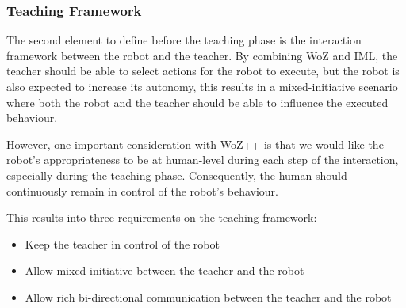 \documentclass[manuscript, review, anonymous]{acmart}
\newcommand{\ra}[1]{\renewcommand{\arraystretch}{#1}}
\newcommand{\woz}{WoZ++\xspace}
\begin{document}

\subsubsection{Teaching Framework}	

\label{sec:framework}
The second element to define before the teaching phase is the interaction
framework between the robot and the teacher. By combining WoZ and IML, the
teacher should be able to select actions for the robot to execute, but the robot
is also expected to increase its autonomy, this results in a mixed-initiative
scenario where both the robot and the teacher should be able to influence the
executed behaviour.

However, one important consideration with \woz is that we would like the robot's
appropriateness to be at human-level during each step of the interaction,
especially during the teaching phase. Consequently, the human should
continuously remain in control of the robot's behaviour.

This results into three requirements on the teaching framework:
\begin{itemize}
    \item Keep the teacher in control of the robot
    \item Allow mixed-initiative between the teacher and the robot
    \item Allow rich bi-directional communication between the teacher and the robot
\end{itemize}
\end{document}
